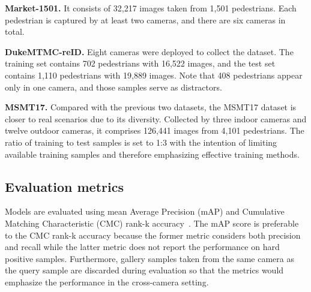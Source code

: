 \documentclass{article}
\begin{document}
\noindent\textbf{Market-1501.}
It consists of 32,217 images taken from 1,501 pedestrians.
Each pedestrian is captured by at least two cameras, and there are six cameras in total.

\noindent\textbf{DukeMTMC-reID.}
Eight cameras were deployed to collect the dataset.
The training set contains 702 pedestrians with 16,522 images, and the test set contains 1,110 pedestrians with 19,889 images.
Note that 408 pedestrians appear only in one camera, and those samples serve as distractors.

\noindent\textbf{MSMT17.}
Compared with the previous two datasets, the MSMT17 dataset is closer to real scenarios due to its diversity.
Collected by three indoor cameras and twelve outdoor cameras, it comprises 126,441 images from 4,101 pedestrians.
The ratio of training to test samples is set to 1:3 with the intention of limiting available training samples and therefore emphasizing effective training methods.

\subsection{Evaluation metrics}

Models are evaluated using mean Average Precision (mAP) and Cumulative Matching Characteristic (CMC) rank-k accuracy~\cite{zheng2015scalable}.
The mAP score is preferable to the CMC rank-k accuracy because the former metric considers both precision and recall while the latter metric does not report the performance on hard positive samples.
Furthermore, gallery samples taken from the same camera as the query sample are discarded during evaluation so that the metrics would emphasize the performance in the cross-camera setting.
\end{document}
